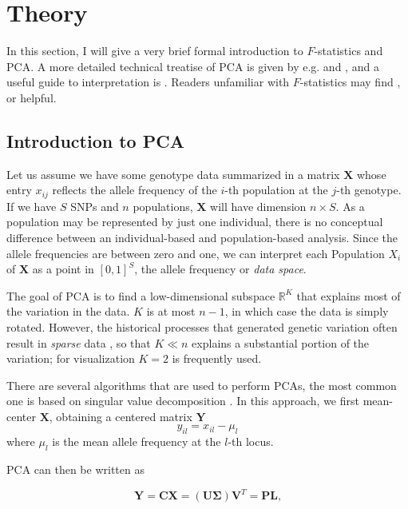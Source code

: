 \documentclass[12pt,fullpage, a4paper]{article}
\newcommand{\MX}{\mathbf{X}} %
\newcommand{\MC}{\mathbf{C}} %
\newcommand{\MY}{\mathbf{Y}} %
\newcommand{\MP}{\mathbf{P}} %
\newcommand{\ML}{\mathbf{L}} %
\newcommand{\MSINGULAR}{\mathbf{\Sigma}} %
\begin{document}
	
\section{Theory}
In this section, I will give a very brief formal introduction to $F$-statistics and PCA. A more detailed technical treatise of PCA is given by e.g. \cite{jolliffe2013} and \cite{pachter2014}, and a useful guide to interpretation is \cite{cavalli-sforza1994}. Readers unfamiliar with $F$-statistics may find \cite{patterson2012}, \cite{peter2016} or \cite{oteo-garcia2021} helpful.

\subsection{Introduction to PCA}
Let us assume we have some genotype data summarized in a matrix $\MX$ whose entry $x_{ij}$ reflects the allele frequency of the $i$-th population at the $j$-th genotype. If we have $S$ SNPs and $n$ populations, $\MX$ will have dimension $n \times S$. As a population may be represented by just one individual, there is no conceptual difference between an individual-based and population-based analysis. Since the allele
frequencies are between zero and one, we can interpret each Population $X_i$
of $\MX$ as a point in $[0, 1]^S$, the allele frequency or \emph{data space}.
	
The goal of PCA is to find a low-dimensional subspace $\mathbb{R}^K$ that explains most of the variation in the data. $K$ is at most $n-1$, in which case the data is simply rotated. However, the  historical processes that generated genetic variation often result in \emph{sparse} data \citep{engelhardt2010}, so that $K \ll n$ explains a substantial portion of the variation; for visualization $K=2$ is frequently used. 
	
	
There are several algorithms that are used to perform PCAs, the most common one is based on singular value decomposition \citep{jolliffe2013}. In this approach, we first mean-center $\MX$, obtaining a centered matrix $\MY$
	\begin{equation*}
	y_{il} = x_{il} - \mu_l
	\end{equation*}
	where $\mu_l$ is the mean allele frequency at the $l$-th locus.
	
	PCA can then be written as
	
	\begin{equation}
	\MY = \MC\MX = (\mathbf{U} \MSINGULAR) \mathbf{V}^T = \MP\ML\text{,}
	\end{equation}
	
\end{document}
